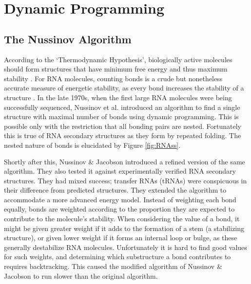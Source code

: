 \documentclass[12pt, a4paper]{article}
\begin{document}
\section{Dynamic Programming}
\subsection{The Nussinov Algorithm}
According to the `Thermodynamic Hypothesis', biologically active molecules should form structures that have minimum free energy and thus maximum stability \cite{anfinsen1973principles}. For RNA molecules, counting bonds is a crude but nonetheless accurate measure of energetic stability, as every bond increases the
stability of a structure \cite{nussinov1978algorithms}. In the late 1970s, when the first large RNA molecules
were being successfully sequenced, Nussinov et al. \cite{nussinov1978algorithms} introduced an algorithm to find a single structure with maximal number of bonds using dynamic programming. This is possible only with the restriction that all bonding pairs are nested. Fortunately this is true of RNA secondary structures as they form by repeated folding. The nested nature of bonds is elucidated by Figure \ref{fig:RNAss}.

Shortly after this, Nussinov \& Jacobson \cite{nussinov1980fast} introduced
a refined version of the same algorithm. They also tested it against experimentally verified RNA secondary structures. They had mixed success; transfer RNAs
(tRNAs) were conspicuous in their difference from predicted structures. They extended the algorithm to accommodate a more advanced energy model. Instead of weighting each bond equally, bonds are weighted
according to the proportion they are expected to contribute to the molecule's
stability. When considering the value of a bond, it might be given greater
weight if it adds to the formation of a stem (a stabilizing structure), or
given lower weight if it forms an internal loop or bulge, as these generally
destabilize RNA molecules. Unfortunately it is hard to find good values for
such weights, and determining which substructure a bond contributes to requires
backtracking. This caused the modified algorithm of Nussinov \& Jacobson to run slower than the original algorithm.
\end{document}
